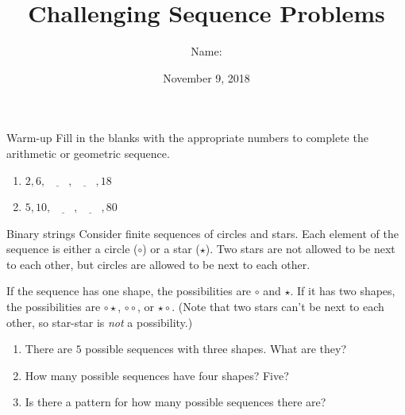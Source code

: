 \documentclass[12pt,letterpaper]{article}
\title{Challenging Sequence Problems}
\author{Name: \underline{\hspace{5cm}}}
\date{November 9, 2018}
\begin{document}
\maketitle

\thispagestyle{empty}

\begin{problem}{Warm-up}
Fill in the blanks with the appropriate numbers to complete the arithmetic or
geometric sequence.

\begin{enumerate}
 \item $2, 6, \underline{\hspace{2em}}, \underline{\hspace{2em}}, 18$
 \item $5, 10, \underline{\hspace{2em}}, \underline{\hspace{2em}}, 80$
\end{enumerate}
\end{problem}

\begin{problem}{Binary strings}
 Consider finite sequences of circles and stars. Each element of the sequence is
 either a circle ($\circ$) or a star ($\star$). Two stars are not allowed to be
 next to each other, but circles are allowed to be next to each other.

 If the sequence has one shape, the possibilities are $\circ$ and $\star$. If it
 has two shapes, the possibilities are $\circ \star$, $\circ \circ$, or $\star
 \circ$. (Note that two stars can't be next to each other, so star-star is
 \emph{not} a possibility.)

 \begin{enumerate}
  \item There are $5$ possible sequences with three shapes. What are they?
  \item How many possible sequences have four shapes? Five?
  \item Is there a pattern for how many possible sequences there are?
 \end{enumerate}
\end{problem}
\end{document}
